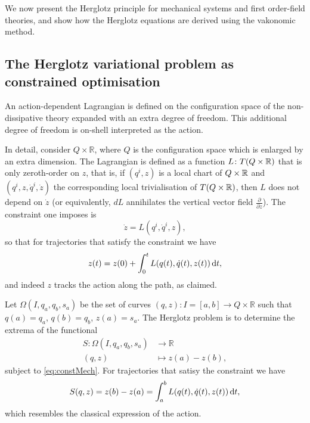 \documentclass[../main.tex]{subfiles}
\begin{document}
We now present the Herglotz principle for mechanical systems and first order-field theories, and show how the Herglotz equations are derived using the vakonomic method.

\subsection{The Herglotz variational problem as constrained optimisation}
An action-dependent Lagrangian is defined on the configuration space of the non-dissipative theory expanded with an extra degree of freedom. This additional degree of freedom is on-shell interpreted as the action.

In detail, consider $Q\times\mathbb{R}$, where $Q$ is the configuration space which is enlarged by an extra dimension. The Lagrangian is defined as a function \( L \colon T(Q\times \mathbb{R}) \) that is only zeroth-order on \(z\), that is, if \((q^i, z)\) is a local chart of \(Q\times\mathbb{R}\) and $(q^i,z,\dot{q}^i,\dot z)$ the corresponding local trivialisation of \(T(Q\times \mathbb{R})\), then \(L\) does not depend on \(\dot{z}\) (or equivalently, \(dL\)  annihilates the vertical vector field \(\frac{\partial}{\partial \dot z}\)). The constraint one imposes is
\begin{equation}\label{eq:constMech}
\dot{z}=L(q^i,\dot{q}^i,z),
\end{equation}
so that for trajectories that satisfy the constraint we have
\begin{equation}
z(t) = z(0) + \int_0^t L(q(t), \dot{q}(t), z(t)) \,\mathrm{d} t,
\end{equation}
and indeed \(z\) tracks the action along the path, as claimed.

Let $\Omega(I,q_a,q_b,s_a)$ be the set of curves $(q,z):I=[a,b]\rightarrow Q\times\mathbb{R}$ such that $q(a)=q_a$, $q(b)=q_b$, $z(a)=s_a$. The Herglotz problem is to determine the extrema of the functional
\begin{equation*}
    \begin{aligned}
        S: \Omega(I,q_a,q_b,s_a) &\longrightarrow \mathbb{R}\\
        (q,z) &\longmapsto z(a) - z(b),
    \end{aligned}
\end{equation*}
subject to \cref{eq:constMech}. For trajectories that satisy the constraint we have
\begin{equation}
    S(q,z) = z(b) - z(a) = \int_a^b L(q(t), \dot{q}(t), z(t)) \,\mathrm{d} t,
\end{equation}
which resembles the classical expression of the action.
\end{document}
